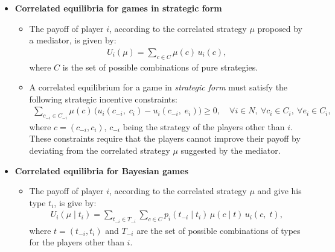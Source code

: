 \documentclass[a4paper,notitlepage,12pt]{article}
\begin{document}
\begin{itemize}[leftmargin=*]
\renewcommand{\labelitemi}{$\bullet$}

	\item \textbf{Correlated equilibria for games in strategic form}
	\vspace{.3cm}

	\begin{itemize}

		\item The payoff of player $i$, according to the correlated strategy $\mu$ proposed by a mediator, is given by:
		\begin{align*}
			U_i(\mu) = \sum_{c \in C} \mu(c) \, u_i(c),
		\end{align*}
		where $C$ is the set of possible combinations of pure strategies.
			
		\item A correlated equilibrium for a game in \emph{strategic form} must satisfy the following strategic incentive constraints:
		\begin{align*}
			\sum_{c_{-i} \in C_{-i}} \mu(c) \, \big( u_i(c_{-i}, \; c_i) - u_i(c_{-i}, \; e_i) \big) \geq 0, \quad \forall i \in N, \ \forall c_i \in C_i, \ \forall e_i \in C_i,
		\end{align*}
		where $c = (c_{-i}, c_i)$, $c_{-i}$ being the strategy of the players other than $i$. These constraints require that the players cannot improve their payoff by deviating from the correlated strategy $\mu$ suggested by the mediator.
			
	\end{itemize}
	\vspace{.3cm}

	\item \textbf{Correlated equilibria for Bayesian games}
	\vspace{.3cm}

	\begin{itemize}

		\item The payoff of player $i$, according to the correlated strategy $\mu$ and give his type $t_i$, is give by:
		\begin{align*}
			U_i(\mu \; | \; t_i) = \sum_{t_{-i} \in T_{-i}} \sum_{c \in C} p_i(t_{-i} \; | \; t_i) \, \mu(c \; | \; t) \, u_i(c, \; t),
		\end{align*}
		where $t = (t_{-i}, t_i)$ and $T_{-i}$ are the set of possible combinations of types for the  players other than $i$.
		

\end{itemize}
\end{itemize}
\end{document}
